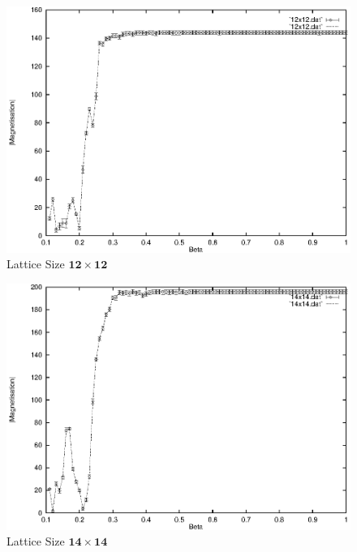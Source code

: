 \documentclass[a4paper]{IEEEtran}
\begin{document}
    \begin{figure} 
    \caption{Lattice Size $\mathbf{12 \times 12}$}
    \label{fig:12x12-1} 
    \begin{center}
        \includegraphics[width=\columnwidth]{12x12_1.eps}
    \end{center}
    \end{figure} 

    \begin{figure} 
    \caption{Lattice Size $\mathbf{14 \times 14}$}
    \label{fig:14x14-1}
    \begin{center}
        \includegraphics[width=\columnwidth]{14x14_1.eps}
    \end{center}
    \end{figure} 
\end{document}
